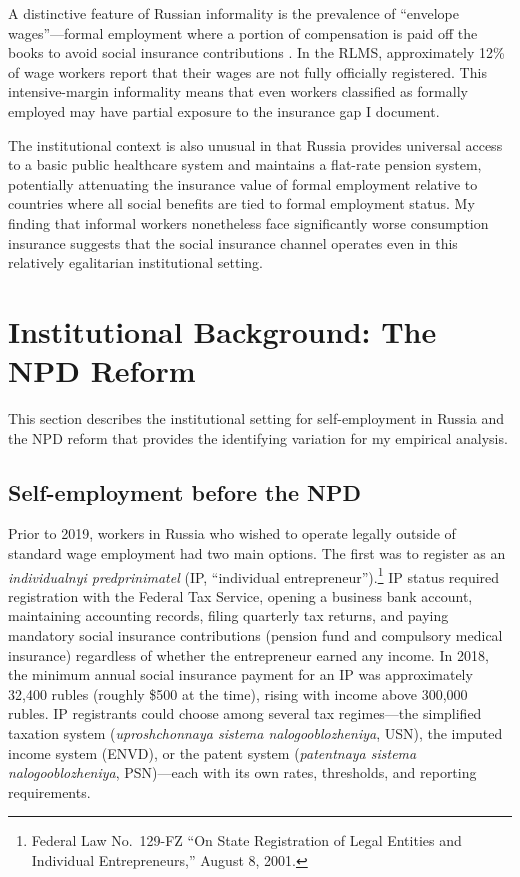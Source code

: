 \documentclass[12pt]{article}
\begin{document}
A distinctive feature of Russian informality is the prevalence of ``envelope wages''---formal employment where a portion of compensation is paid off the books to avoid social insurance contributions \citep{GimpelsonKapeliushnikov2014}. In the RLMS, approximately 12\% of wage workers report that their wages are not fully officially registered. This intensive-margin informality means that even workers classified as formally employed may have partial exposure to the insurance gap I document.

The institutional context is also unusual in that Russia provides universal access to a basic public healthcare system and maintains a flat-rate pension system, potentially attenuating the insurance value of formal employment relative to countries where all social benefits are tied to formal employment status. My finding that informal workers nonetheless face significantly worse consumption insurance suggests that the social insurance channel operates even in this relatively egalitarian institutional setting.


\section{Institutional Background: The NPD Reform}
\label{sec:background}

This section describes the institutional setting for self-employment in Russia and the NPD reform that provides the identifying variation for my empirical analysis.

\subsection{Self-employment before the NPD}

Prior to 2019, workers in Russia who wished to operate legally outside of standard wage employment had two main options. The first was to register as an \textit{individualnyi predprinimatel} (IP, ``individual entrepreneur'').\footnote{Federal Law No.~129-FZ ``On State Registration of Legal Entities and Individual Entrepreneurs,'' August 8, 2001.} IP status required registration with the Federal Tax Service, opening a business bank account, maintaining accounting records, filing quarterly tax returns, and paying mandatory social insurance contributions (pension fund and compulsory medical insurance) regardless of whether the entrepreneur earned any income. In 2018, the minimum annual social insurance payment for an IP was approximately 32,400 rubles (roughly \$500 at the time), rising with income above 300,000 rubles. IP registrants could choose among several tax regimes---the simplified taxation system (\textit{uproshchonnaya sistema nalogooblozheniya}, USN), the imputed income system (ENVD), or the patent system (\textit{patentnaya sistema nalogooblozheniya}, PSN)---each with its own rates, thresholds, and reporting requirements.
\end{document}

